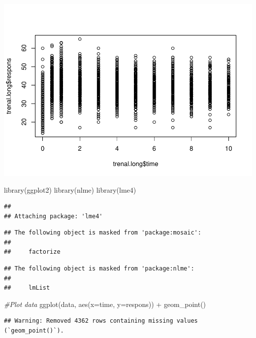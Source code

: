 \documentclass[
]{article}
\newenvironment{Shaded}{\begin{snugshade}}{\end{snugshade}}
\newcommand{\AttributeTok}[1]{\textcolor[rgb]{0.77,0.63,0.00}{#1}}
\newcommand{\CommentTok}[1]{\textcolor[rgb]{0.56,0.35,0.01}{\textit{#1}}}
\newcommand{\FunctionTok}[1]{\textcolor[rgb]{0.00,0.00,0.00}{#1}}
\newcommand{\NormalTok}[1]{#1}
\newcommand{\SpecialCharTok}[1]{\textcolor[rgb]{0.00,0.00,0.00}{#1}}
\begin{document}
\includegraphics{LDA_Wan_files/figure-latex/unnamed-chunk-7-1.pdf}

\begin{Shaded}
\begin{Highlighting}[]
\FunctionTok{library}\NormalTok{(ggplot2)}
\FunctionTok{library}\NormalTok{(nlme)}
\FunctionTok{library}\NormalTok{(lme4)}
\end{Highlighting}
\end{Shaded}

\begin{verbatim}
## 
## Attaching package: 'lme4'
\end{verbatim}

\begin{verbatim}
## The following object is masked from 'package:mosaic':
## 
##     factorize
\end{verbatim}

\begin{verbatim}
## The following object is masked from 'package:nlme':
## 
##     lmList
\end{verbatim}

\begin{Shaded}
\begin{Highlighting}[]
\CommentTok{\#Plot data}
\FunctionTok{ggplot}\NormalTok{(data, }\FunctionTok{aes}\NormalTok{(}\AttributeTok{x=}\NormalTok{time, }\AttributeTok{y=}\NormalTok{respons)) }\SpecialCharTok{+} \FunctionTok{geom\_point}\NormalTok{()}
\end{Highlighting}
\end{Shaded}

\begin{verbatim}
## Warning: Removed 4362 rows containing missing values (`geom_point()`).
\end{verbatim}
\end{document}
